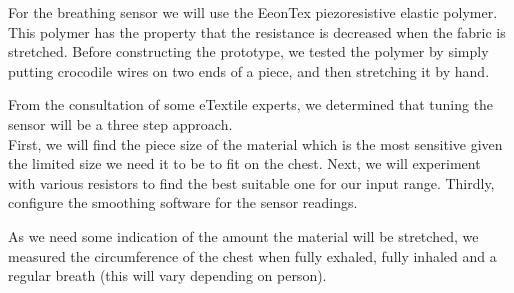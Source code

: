 \documentclass{sigchi-ext}
\begin{document}

For the breathing sensor we will use the EeonTex piezoresistive elastic polymer.
This polymer has the property that the resistance is decreased when the fabric
is stretched.
Before constructing the prototype, we tested the polymer by simply putting
crocodile wires on two ends of a piece, and then stretching it by hand.

From the consultation of some eTextile experts, we determined
that tuning the sensor will be a three step approach.\\
First, we will find the piece size of the material which
is the most sensitive given the limited size we need it to be
to fit on the chest. Next, we will experiment with various 
resistors to find the best suitable one for our input range.
Thirdly, configure the smoothing software for the sensor readings.

As we need some indication of the amount the material will
be stretched, we measured the circumference of the chest 
when fully exhaled, fully inhaled and a regular breath 
(this will vary depending on person).
\end{document}
